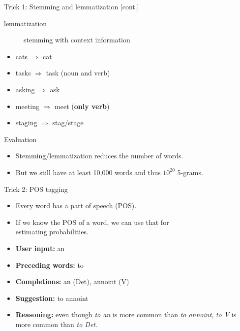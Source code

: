 \documentclass[professionalfonts, xcolor={usenames,svgnames,x11names,table}]{beamer}
\begin{document}
\begin{frame}{Trick 1: Stemming and lemmatization [cont.]}
    \begin{description}
        \item[lemmatization] stemming with context information
    \end{description}

    \begin{example}
        \begin{itemize}
            \item cats $\Rightarrow$ cat
            \item tasks $\Rightarrow$ task (noun and verb)
            \item asking $\Rightarrow$ ask
            \item meeting $\Rightarrow$ meet (\textbf{only verb})
            \item staging $\Rightarrow$ stag\slash stage
        \end{itemize}
    \end{example}

    \begin{block}{Evaluation}
        \begin{itemize}
            \item Stemming\slash lemmatization reduces the number of words.
            \item But we still have at least 10,000 words and thus $10^{20}$ 5-grams.
        \end{itemize}
    \end{block}
\end{frame}

\begin{frame}{Trick 2: POS tagging}
    \begin{itemize}
        \item Every word has a part of speech (POS).
        \item If we know the POS of a word, we can use that for\\
              estimating probabilities.
    \end{itemize}

    \begin{example}
        \begin{itemize}
            \item \textbf{User input:} an
            \item \textbf{Preceding words:} to
            \item \textbf{Completions:} an (Det), annoint (V)
            \item \textbf{Suggestion:} to annoint
            \item \textbf{Reasoning:}
                    even though \emph{to an} is more common than \emph{to annoint}, 
                    \emph{to V} is more common than \emph{to Det}.
        \end{itemize}
    \end{example}
\end{frame}
\end{document}
